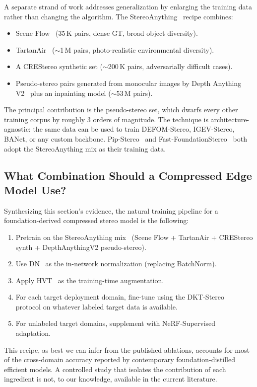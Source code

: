 A separate strand of work addresses generalization by enlarging the training data rather than changing the algorithm. The StereoAnything~\cite{guo2024stereoanything} recipe combines:

\begin{itemize}
\item Scene Flow~\cite{mayer2016sceneflow} (35\,K pairs, dense GT, broad object diversity).
\item TartanAir~\cite{wang2020tartanair} ($\sim$1\,M pairs, photo-realistic environmental diversity).
\item A CREStereo synthetic set ($\sim$200\,K pairs, adversarially difficult cases).
\item Pseudo-stereo pairs generated from monocular images by Depth Anything V2~\cite{yang2024dav2} plus an inpainting model ($\sim$53\,M pairs).
\end{itemize}

The principal contribution is the pseudo-stereo set, which dwarfs every other training corpus by roughly 3 orders of magnitude. The technique is architecture-agnostic: the same data can be used to train DEFOM-Stereo, IGEV-Stereo, BANet, or any custom backbone. Pip-Stereo~\cite{zheng2026pipstereo} and Fast-FoundationStereo~\cite{wen2026fastfoundationstereo} both adopt the StereoAnything mix as their training data.

\subsection{What Combination Should a Compressed Edge Model Use?}

Synthesizing this section's evidence, the natural training pipeline for a foundation-derived compressed stereo model is the following:

\begin{enumerate}
\item Pretrain on the StereoAnything mix~\cite{guo2024stereoanything} (Scene Flow + TartanAir + CREStereo synth + DepthAnythingV2 pseudo-stereo).
\item Use DN~\cite{zhang2020dsmnet} as the in-network normalization (replacing BatchNorm).
\item Apply HVT~\cite{chang2023hvt} as the training-time augmentation.
\item For each target deployment domain, fine-tune using the DKT-Stereo~\cite{zhang2024dkt} protocol on whatever labeled target data is available.
\item For unlabeled target domains, supplement with NeRF-Supervised~\cite{tosi2023nerfsupervised} adaptation.
\end{enumerate}

This recipe, as best we can infer from the published ablations, accounts for most of the cross-domain accuracy reported by contemporary foundation-distilled efficient models. A controlled study that isolates the contribution of each ingredient is not, to our knowledge, available in the current literature.
